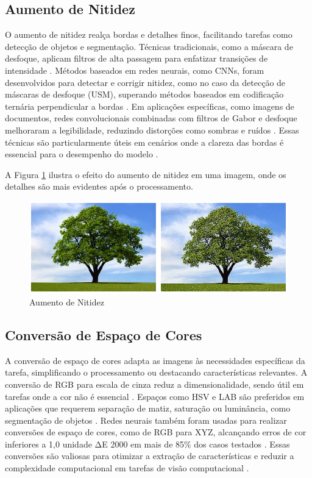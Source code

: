 \subsection{Aumento de Nitidez}
O aumento de nitidez realça bordas e detalhes finos, facilitando tarefas como detecção de objetos e segmentação. Técnicas tradicionais, como a máscara de desfoque, aplicam filtros de alta passagem para enfatizar transições de intensidade \cite{sciencedirect2023normalization}. Métodos baseados em redes neurais, como CNNs, foram desenvolvidos para detectar e corrigir nitidez, como no caso da detecção de máscaras de desfoque (USM), superando métodos baseados em codificação ternária perpendicular a bordas \cite{ding2018detecting}. Em aplicações específicas, como imagens de documentos, redes convolucionais combinadas com filtros de Gabor e desfoque melhoraram a legibilidade, reduzindo distorções como sombras e ruídos \cite{ben2022deep}. Essas técnicas são particularmente úteis em cenários onde a clareza das bordas é essencial para o desempenho do modelo \cite{sharma2024deep}.

A Figura \ref{fig:aumento_de_nitidez} ilustra o efeito do aumento de nitidez em uma imagem, onde os detalhes são mais evidentes após o processamento.

\begin{figure}[H]
    \centering
    \caption{\label{fig:aumento_de_nitidez}Aumento de Nitidez}
    \includegraphics[width=1\textwidth]{img/revisao_bibliografica/aumento_de_nitidez.png}
\end{figure}

\subsection{Conversão de Espaço de Cores}
A conversão de espaço de cores adapta as imagens às necessidades específicas da tarefa, simplificando o processamento ou destacando características relevantes. A conversão de RGB para escala de cinza reduz a dimensionalidade, sendo útil em tarefas onde a cor não é essencial \cite{sharma2024deep}. Espaços como HSV e LAB são preferidos em aplicações que requerem separação de matiz, saturação ou luminância, como segmentação de objetos \cite{sharma2024deep}. Redes neurais também foram usadas para realizar conversões de espaço de cores, como de RGB para XYZ, alcançando erros de cor inferiores a 1,0 unidade ΔE 2000 em mais de 85\% dos casos testados \cite{macdonald2019color}. Essas conversões são valiosas para otimizar a extração de características e reduzir a complexidade computacional em tarefas de visão computacional \cite{sharma2024deep}.

